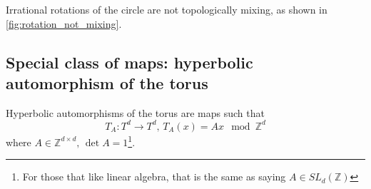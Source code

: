 \begin{observation}
    Irrational rotations of the circle are not topologically mixing, as shown in \autoref{fig:rotation_not_mixing}.
\end{observation}

\subsection{Special class of maps: hyperbolic automorphism of the torus}
\begin{definition}
    Hyperbolic automorphisms of the torus are maps such that \begin{equation*}
    T_A:T^d\rightarrow T^d,\, T_A(x)=Ax \mod \mathbb{Z}^d
    \end{equation*}
    where $A\in\mathbb{Z}^{d\times d},\, \det A=1$\footnote{For those that like linear algebra, that is the same as saying $A\in SL_d(\mathbb{Z})$}.
\end{definition}

